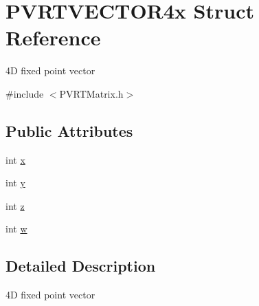 \hypertarget{struct_p_v_r_t_v_e_c_t_o_r4x}{\section{P\+V\+R\+T\+V\+E\+C\+T\+O\+R4x Struct Reference}
\label{struct_p_v_r_t_v_e_c_t_o_r4x}
}


4\+D fixed point vector  




{\ttfamily \#include $<$P\+V\+R\+T\+Matrix.\+h$>$}

\subsection*{Public Attributes}
\begin{DoxyCompactItemize}
\item 
int \hyperlink{struct_p_v_r_t_v_e_c_t_o_r4x_af155dde870e011662177b1edea2bd61e}{x}
\item 
int \hyperlink{struct_p_v_r_t_v_e_c_t_o_r4x_a31b39ba6fc322352bb27b334130ad14f}{y}
\item 
int \hyperlink{struct_p_v_r_t_v_e_c_t_o_r4x_a21e012e710b2d988831552b8feec1b94}{z}
\item 
int \hyperlink{struct_p_v_r_t_v_e_c_t_o_r4x_aa21321d20ddb936a51fac7df2579c923}{w}
\end{DoxyCompactItemize}


\subsection{Detailed Description}
4\+D fixed point vector 



 


